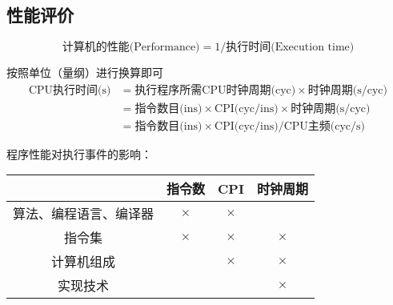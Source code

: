 \subsection{性能评价}
\label{subsec:performance}
\[\text{计算机的性能(Performance)}=1/\text{执行时间(Execution time)}\]
\par 按照单位（量纲）进行换算即可
\[\begin{aligned}
\text{CPU执行时间(s)}&=\text{执行程序所需CPU时钟周期(cyc)}\times\text{时钟周期(s/cyc)}\\
&=\text{指令数目(ins)}\times\text{CPI(cyc/ins)}\times\text{时钟周期(s/cyc)}\\
&=\text{指令数目(ins)}\times\text{CPI(cyc/ins)}/\text{CPU主频(cyc/s)}
\end{aligned}\]

程序性能对执行事件的影响：
\begin{center}
\begin{tabular}{|c|c|c|c|}\hline
 & 指令数 & CPI & 时钟周期\\\hline
算法、编程语言、编译器 & $\times$ & $\times$ & \\\hline
指令集 & $\times$ & $\times$ & $\times$ \\\hline
计算机组成 & & $\times$ & $\times$ \\\hline
实现技术 & & & $\times$\\\hline
\end{tabular}
\end{center}